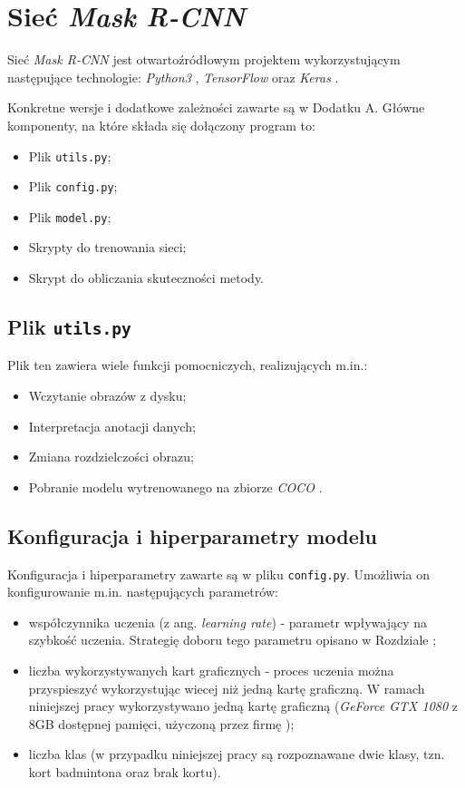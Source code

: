 \newpage
\section{Sieć \textit{Mask R-CNN}}

Sieć \textit{Mask R-CNN} \cite{matterport-mask-rcnn} jest otwartoźródłowym projektem wykorzystującym następujące technologie: \textit{Python3} \cite{python}, \textit{TensorFlow} \cite{tensorflow} oraz \textit{Keras} \cite{keras}.

Konkretne wersje i dodatkowe zależności zawarte są w Dodatku A. Główne komponenty, na które składa się dołączony program to:

\begin{itemize}
\item Plik \texttt{utils.py};
  \item Plik \texttt{config.py};
  \item Plik  \texttt{model.py};
  \item Skrypty do trenowania sieci;
  \item Skrypt do obliczania skuteczności metody.
\end{itemize}

\subsection*{Plik \texttt{utils.py}}

Plik ten zawiera wiele funkcji pomocniczych, realizujących m.in.:
\begin{itemize}
  \item Wczytanie obrazów z dysku;
  \item Interpretacja anotacji danych;
  \item Zmiana rozdzielczości obrazu;
  \item Pobranie modelu wytrenowanego na zbiorze \textit{COCO} \cite{coco}.
\end{itemize}

\subsection*{Konfiguracja i hiperparametry modelu}

Konfiguracja i hiperparametry zawarte są w pliku \texttt{config.py}. Umożliwia on konfigurowanie m.in. następujących parametrów:
\begin{itemize}
  \item współczynnika uczenia (z ang. \textit{learning rate}) - parametr wpływający na szybkość uczenia. Strategię doboru tego parametru opisano w Rozdziale ;
  \item liczba wykorzystywanych kart graficznych - proces uczenia można przyspieszyć wykorzystując wiecej niż jedną kartę graficzną. W ramach niniejszej pracy wykorzystywano jedną kartę graficzną (\textit{GeForce GTX 1080} z 8GB dostępnej pamięci, użyczoną przez firmę \blue{});
  \item liczba klas (w przypadku niniejszej pracy są rozpoznawane dwie klasy, tzn. kort badmintona oraz brak kortu).
\end{itemize}


